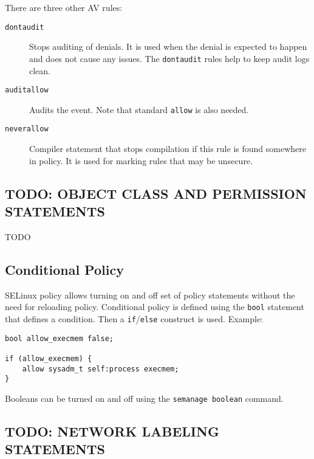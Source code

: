 There are three other AV rules:
\begin{description}
    \item [\texttt{dontaudit}] Stops auditing of denials. It is used when the
        denial is expected to happen and does not cause any issues. The
        \texttt{dontaudit} rules help to keep audit logs clean.
    \item [\texttt{auditallow}] Audits the event. Note that standard
        \texttt{allow} is also needed.
    \item [\texttt{neverallow}] Compiler statement that stops compilation if
        this rule is found somewhere in policy. It is used for marking rules
        that may be unsecure.
\end{description}

\subsection{TODO: OBJECT CLASS AND PERMISSION STATEMENTS}

TODO

\subsection{Conditional Policy}

SELinux policy allows turning on and off set of policy statements without the
need for reloading policy. Conditional policy is defined using the \texttt{bool}
statement that defines a condition. Then a \texttt{if}/\texttt{else} construct
is used. Example:
\begin{lstlisting}
bool allow_execmem false;

if (allow_execmem) {
    allow sysadm_t self:process execmem;
}
\end{lstlisting}
Booleans can be turned on and off using the \texttt{semanage boolean} command.

\subsection{TODO: NETWORK LABELING STATEMENTS}

